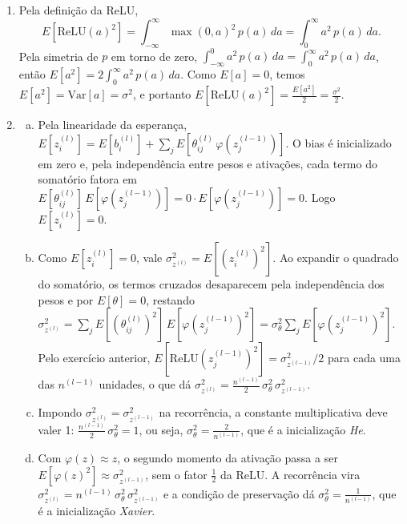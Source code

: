 \documentclass{dlproblemset}
\begin{document}
\begin{enumerate}[1)]
    \item Pela definição da ReLU,
    \begin{equation*}
        E[\mathrm{ReLU}(a)^2]=\int_{-\infty}^{\infty}\max(0,a)^2\,p(a)\,da=\int_{0}^{\infty}a^2\,p(a)\,da.
    \end{equation*}
    Pela simetria de $p$ em torno de zero, $\int_{-\infty}^{0}a^2\,p(a)\,da=\int_{0}^{\infty}a^2\,p(a)\,da$, então $E[a^2]=2\int_{0}^{\infty}a^2\,p(a)\,da$. Como $E[a]=0$, temos $E[a^2]=\mathrm{Var}[a]=\sigma^2$, e portanto $E[\mathrm{ReLU}(a)^2]=\frac{E[a^2]}{2}=\frac{\sigma^2}{2}$.

    \item
    \begin{enumerate}[a)]
        \item Pela linearidade da esperança, $E[z^{(l)}_i]=E[b^{(l)}_i]+\sum_j E[\theta^{(l)}_{ij}\,\varphi(z^{(l-1)}_j)]$. O bias é inicializado em zero e, pela independência entre pesos e ativações, cada termo do somatório fatora em $E[\theta^{(l)}_{ij}]\,E[\varphi(z^{(l-1)}_j)]=0\cdot E[\varphi(z^{(l-1)}_j)]=0$. Logo $E[z^{(l)}_i]=0$.
        \item Como $E[z^{(l)}_i]=0$, vale $\sigma^2_{z^{(l)}}=E[(z^{(l)}_i)^2]$. Ao expandir o quadrado do somatório, os termos cruzados desaparecem pela independência dos pesos e por $E[\theta]=0$, restando $\sigma^2_{z^{(l)}}=\sum_j E[(\theta^{(l)}_{ij})^2]\,E[\varphi(z^{(l-1)}_j)^2]=\sigma_\theta^2\sum_j E[\varphi(z^{(l-1)}_j)^2]$. Pelo exercício anterior, $E[\mathrm{ReLU}(z^{(l-1)}_j)^2]=\sigma^2_{z^{(l-1)}}/2$ para cada uma das $n^{(l-1)}$ unidades, o que dá $\sigma^2_{z^{(l)}} = \frac{n^{(l-1)}}{2}\,\sigma_\theta^2\,\sigma^2_{z^{(l-1)}}$.
        \item Impondo $\sigma^2_{z^{(l)}}=\sigma^2_{z^{(l-1)}}$ na recorrência, a constante multiplicativa deve valer 1: $\frac{n^{(l-1)}}{2}\,\sigma_\theta^2=1$, ou seja, $\sigma_\theta^2=\frac{2}{n^{(l-1)}}$, que é a inicialização \textit{He}.
        \item Com $\varphi(z)\approx z$, o segundo momento da ativação passa a ser $E[\varphi(z)^2]\approx\sigma^2_{z^{(l-1)}}$, sem o fator $\frac{1}{2}$ da ReLU. A recorrência vira $\sigma^2_{z^{(l)}}=n^{(l-1)}\,\sigma_\theta^2\,\sigma^2_{z^{(l-1)}}$ e a condição de preservação dá $\sigma_\theta^2=\frac{1}{n^{(l-1)}}$, que é a inicialização \textit{Xavier}.
    \end{enumerate}


\end{enumerate}
\end{document}
